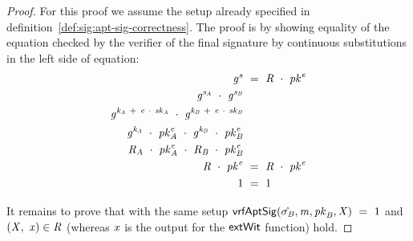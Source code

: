 \begin{proof}
    \label{prf:apt-schnorr-pre-sig-corr}
    For this proof we assume the setup already specified in definition~\ref{def:sig:apt-sig-correctness}.
    The proof is by showing equality of the equation checked by the verifier of the final signature by continuous substitutions in the left side of equation:
    \begin{align}
        \mathit{g}^{\mathit{s}} &~=~ \mathit{R} ~\cdot~ \mathit{pk}^{\mathit{e}} \\
        \mathit{g}^{\mathit{s}_{\mathit{A}}} ~\cdot~ \mathit{g}^{\mathit{s}_{\mathit{B}}} & \\
        \mathit{g}^{\mathit{\mathit{k}_{\mathit{A}}} ~+~ \mathit{e} ~\cdot~ \mathit{sk}_{\mathit{A}}} ~\cdot~ \mathit{g}^{\mathit{\mathit{k}_{\mathit{B}}} ~+~ \mathit{e} ~\cdot~ \mathit{sk}_{\mathit{B}}} & \\
        \mathit{g}^{\mathit{\mathit{k}_{\mathit{A}}}} ~\cdot~ \mathit{pk}_{\mathit{A}}^{\mathit{e}} ~\cdot~ \mathit{g}^{\mathit{\mathit{k}_{\mathit{B}}}} ~\cdot~ \mathit{pk}_{\mathit{B}}^{\mathit{e}} & \\
        \mathit{R}_{\mathit{A}} ~\cdot~ \mathit{pk}_{\mathit{A}}^{\mathit{e}} ~\cdot~ \mathit{R}_{\mathit{B}} ~\cdot~ \mathit{pk}_{\mathit{B}}^{\mathit{e}} & \\
        \mathit{R} ~\cdot~ \mathit{pk}^{\mathit{e}} & ~=~ \mathit{R} ~\cdot~ \mathit{pk}^{\mathit{e}} \\
        1 & ~=~ 1
    \end{align}

    It remains to prove that with the same setup $\mathsf{vrfAptSig}(\hat{\sigma_{\mathit{B}}},\mathit{m},\mathit{pk}_{\mathit{B}},\mathit{X}) ~=~ 1$ and
    $(\mathit{X} ,~ \mathit{x}) \in \mathit{R}$ (whereas  $\mathit{x}$ is the output for the $\mathsf{extWit}$ function) hold.


\end{proof}
